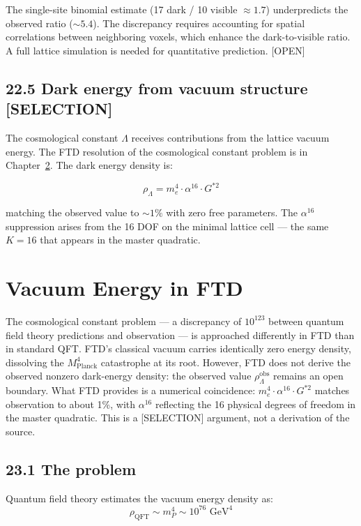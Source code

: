 \documentclass[
  11pt,
  letterpaper,
  twoside,
  openright]{book}
\begin{document}
The single-site binomial estimate (17 dark / 10 visible \(\approx 1.7\))
underpredicts the observed ratio (\(\sim 5.4\)). The discrepancy
requires accounting for spatial correlations between neighboring voxels,
which enhance the dark-to-visible ratio. A full lattice simulation is
needed for quantitative prediction. {[}OPEN{]}

\section{22.5 Dark energy from vacuum structure
{[}SELECTION{]}}\label{dark-energy-from-vacuum-structure-selection}

The cosmological constant \(\Lambda\) receives contributions from the
lattice vacuum energy. The FTD resolution of the cosmological constant
problem is in Chapter~\ref{sec-vacuum}. The dark energy density is:

\[
\rho_\Lambda = m_e^4 \cdot \alpha^{16} \cdot G^{*2}
\tag{22.2}
\]

matching the observed value to \(\sim 1\%\) with zero free parameters.
The \(\alpha^{16}\) suppression arises from the 16 DOF on the minimal
lattice cell --- the same \(K = 16\) that appears in the master
quadratic.

\chapter{Vacuum Energy in FTD}\label{sec-vacuum}

The cosmological constant problem --- a discrepancy of \(10^{123}\)
between quantum field theory predictions and observation --- is
approached differently in FTD than in standard QFT. FTD's classical
vacuum carries identically zero energy density, dissolving the
\(M_\text{Planck}^4\) catastrophe at its root. However, FTD does not
derive the observed nonzero dark-energy density: the observed value
\(\rho_\Lambda^\text{obs}\) remains an open boundary. What FTD provides
is a numerical coincidence: \(m_e^4 \cdot \alpha^{16} \cdot G^{*2}\)
matches observation to about 1\%, with \(\alpha^{16}\) reflecting the 16
physical degrees of freedom in the master quadratic. This is a
{[}SELECTION{]} argument, not a derivation of the source.

\section{23.1 The problem}\label{the-problem}

Quantum field theory estimates the vacuum energy density as: \[
\rho_{\text{QFT}} \sim m_P^4 \sim 10^{76} \text{ GeV}^4
\]
\end{document}
